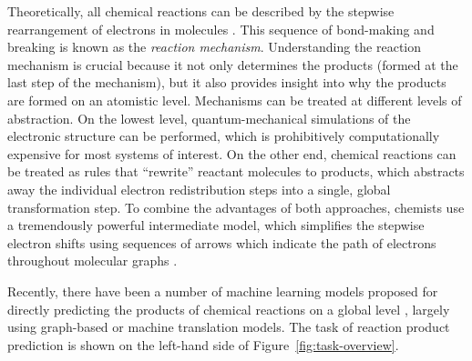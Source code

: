 


Theoretically, all chemical reactions can be described by the stepwise rearrangement of electrons in molecules \cite{herges1994organizing}. 
This sequence of bond-making and breaking is known as the \emph{reaction mechanism}. 
Understanding the reaction mechanism is crucial because it not only determines the products (formed at the last step of the mechanism), 
but it also provides insight into why the products are formed on an atomistic level. 
%
Mechanisms can be treated at different levels of abstraction. 
On the lowest level, quantum-mechanical simulations of the electronic structure can be performed, which is prohibitively computationally expensive for most systems of interest. 
On the other end, chemical reactions can be treated as rules that ``rewrite'' reactant molecules to products, which abstracts away the individual electron redistribution steps into a single, global transformation step. 
To combine the advantages of both approaches, chemists use a tremendously powerful intermediate model, which simplifies the stepwise electron shifts using sequences of arrows which indicate the path of electrons throughout molecular graphs \cite{herges1994organizing}. 

Recently, there have been a number of machine learning models proposed for directly predicting the products of chemical reactions on a global level \cite{coley2017prediction,jin2017predicting,schwaller2017found,neural-symbolic,segler2018planning,wei2016neural}, largely using graph-based or machine translation models. 
The task of reaction product prediction is shown on the left-hand side of Figure~\ref{fig:task-overview}. 

